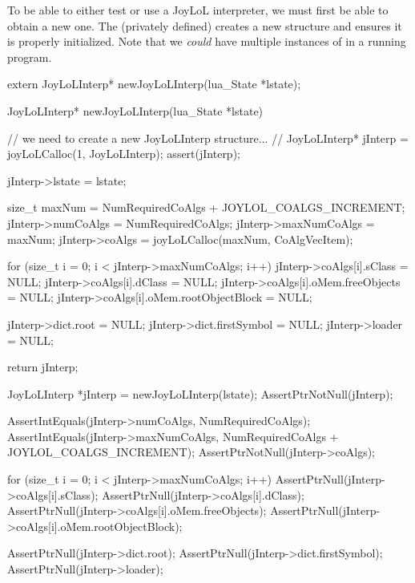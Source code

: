 \startTestSuite[newJoyLoLInterp]

To be able to either test or use a JoyLoL interpreter, we must first be 
able to obtain a new one. The (privately defined)  
creates a new  structure and ensures it is properly 
initialized. Note that we \emph{could} have multiple instances of 
 in a running program. 

\startCHeader
extern JoyLoLInterp* newJoyLoLInterp(lua_State *lstate);
\stopCHeader
{}

\startCCode
JoyLoLInterp* newJoyLoLInterp(lua_State *lstate) {
  // we need to create a new JoyLoLInterp structure...
  //
  JoyLoLInterp* jInterp = joyLoLCalloc(1, JoyLoLInterp);
  assert(jInterp);
  
  jInterp->lstate = lstate;
  
  size_t maxNum =
    NumRequiredCoAlgs + JOYLOL_COALGS_INCREMENT;
  jInterp->numCoAlgs    = NumRequiredCoAlgs;
  jInterp->maxNumCoAlgs = maxNum;
  jInterp->coAlgs    = joyLoLCalloc(maxNum, CoAlgVecItem);
  
  for (size_t i = 0; i < jInterp->maxNumCoAlgs; i++) {
    jInterp->coAlgs[i].sClass               = NULL;
    jInterp->coAlgs[i].dClass               = NULL;
    jInterp->coAlgs[i].oMem.freeObjects     = NULL;
    jInterp->coAlgs[i].oMem.rootObjectBlock = NULL; 
  }
  
  jInterp->dict.root        = NULL;
  jInterp->dict.firstSymbol = NULL;
  jInterp->loader           = NULL;
  
  return jInterp;
}
\stopCCode


\startCTest
  JoyLoLInterp *jInterp = newJoyLoLInterp(lstate);
  AssertPtrNotNull(jInterp);
  
  AssertIntEquals(jInterp->numCoAlgs,
    NumRequiredCoAlgs);
  AssertIntEquals(jInterp->maxNumCoAlgs,
    NumRequiredCoAlgs + JOYLOL_COALGS_INCREMENT);
  AssertPtrNotNull(jInterp->coAlgs);
  
  for (size_t i = 0; i < jInterp->maxNumCoAlgs; i++) {
    AssertPtrNull(jInterp->coAlgs[i].sClass);
    AssertPtrNull(jInterp->coAlgs[i].dClass);
    AssertPtrNull(jInterp->coAlgs[i].oMem.freeObjects);
    AssertPtrNull(jInterp->coAlgs[i].oMem.rootObjectBlock);
  }
  
  AssertPtrNull(jInterp->dict.root);
  AssertPtrNull(jInterp->dict.firstSymbol);
  AssertPtrNull(jInterp->loader);
\stopCTest
\stopTestCase
\stopTestSuite

